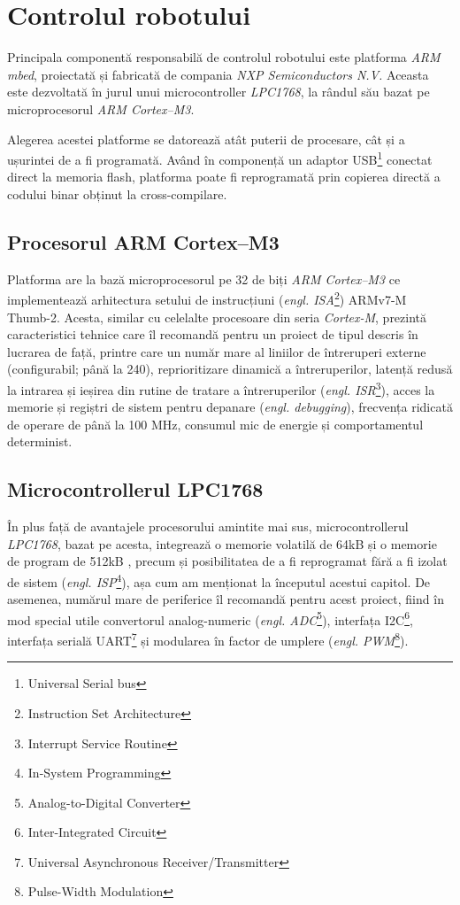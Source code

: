 \section{Controlul robotului}

Principala componentă responsabilă de controlul robotului este platforma \textit{ARM mbed}, proiectată și fabricată de  compania \textit{NXP Semiconductors N.V.} Aceasta este dezvoltată în jurul unui microcontroller \textit{LPC1768}, la rândul său bazat pe microprocesorul \textit{ARM Cortex--M3}.


Alegerea acestei platforme se datorează atât puterii de procesare, cât și a ușurintei de a fi programată. Având în componență un adaptor USB\footnote{Universal Serial bus} conectat direct la memoria flash, platforma poate fi reprogramată prin copierea directă a codului binar obținut la cross-compilare. \cite{toulson}

\subsection{Procesorul ARM Cortex--M3}

Platforma are la bază microprocesorul pe 32 de biți \textit{ARM Cortex--M3} ce implementează arhitectura setului de instrucțiuni (\textit{engl. ISA}\footnote{Instruction Set Architecture}) ARMv7-M Thumb-2. Acesta, similar cu celelalte procesoare din seria \textit{Cortex-M}, prezintă caracteristici tehnice \cite{toulson} care îl recomandă pentru un proiect de tipul descris în lucrarea de față, printre care un număr mare al liniilor de întreruperi externe (configurabil; până la 240), reprioritizare dinamică a întreruperilor, latență redusă la intrarea și ieșirea din rutine de tratare a întreruperilor (\textit{engl. ISR}\footnote{Interrupt Service Routine}), acces la memorie și regiștri de sistem pentru depanare (\textit{engl. debugging}), frecvența ridicată de operare de până la 100 MHz, consumul mic de energie și comportamentul determinist.

\subsection{Microcontrollerul LPC1768}

În plus față de avantajele procesorului amintite mai sus, microcontrollerul \textit{LPC1768}, bazat pe acesta, integrează o memorie volatilă de 64kB și o memorie de program de 512kB \cite{toulson}, precum și posibilitatea de a fi reprogramat fără a fi izolat de sistem (\textit{engl. ISP}\footnote{In-System Programming}), așa cum am menționat la începutul acestui capitol. De asemenea, numărul mare de periferice îl recomandă pentru acest proiect, fiind în mod special utile convertorul analog-numeric (\textit{engl. ADC}\footnote{Analog-to-Digital Converter}), interfața I2C\footnote{Inter-Integrated Circuit}, interfața serială UART\footnote{Universal Asynchronous Receiver/Transmitter} și modularea în factor de umplere (\textit{engl. PWM}\footnote{Pulse-Width Modulation}).


